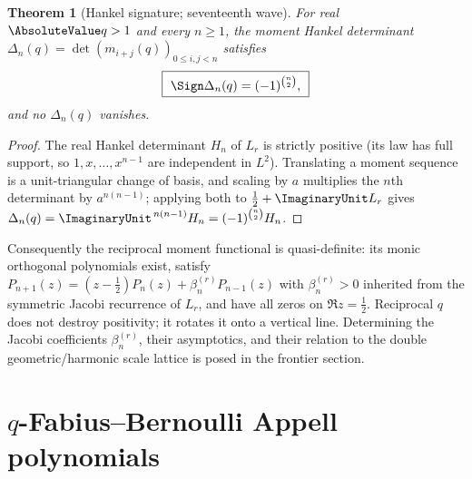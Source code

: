 \documentclass[11pt,oneside]{article}
\numberwithin{equation}{section}
\newtheorem{theorem}{Theorem}[section]
\theoremstyle{definition}
\theoremstyle{remark}
\begin{document}
\begin{theorem}[Hankel signature; seventeenth wave]
\label{p7:thm:hankel}
For real $\AbsoluteValue q>1$ and every $n\ge1$, the moment Hankel determinant
$\Delta_n(q)=\det(m_{i+j}(q))_{0\le i,j<n}$ satisfies
\begin{equation}\label{p7:eq:hankel-signature}
 \boxed{\ \Sign\Delta_n(q)=(-1)^{\binom n2},\ }
\end{equation}
and no $\Delta_n(q)$ vanishes.
\end{theorem}

\begin{proof}
The real Hankel determinant $H_n$ of $L_r$ is strictly positive (its law has
full support, so $1,x,\ldots,x^{n-1}$ are independent in $L^2$).  Translating
a moment sequence is a unit-triangular change of basis, and scaling by $a$
multiplies the $n$th determinant by $a^{n(n-1)}$; applying both to
$\tfrac12+\ImaginaryUnit L_r$ gives $\Delta_n(q)=\ImaginaryUnit^{\,n(n-1)}H_n=(-1)^{\binom n2}H_n$.
\end{proof}

Consequently the reciprocal moment functional is quasi-definite: its monic
orthogonal polynomials exist, satisfy
$P_{n+1}(z)=(z-\tfrac12)P_n(z)+\beta_n^{(r)}P_{n-1}(z)$ with
$\beta_n^{(r)}>0$ inherited from the symmetric Jacobi recurrence of $L_r$, and
have all zeros on $\Re z=\tfrac12$.  Reciprocal $q$ does not destroy
positivity; it rotates it onto a vertical line.  Determining the Jacobi
coefficients $\beta_n^{(r)}$, their asymptotics, and their relation to the
double geometric/harmonic scale lattice is posed in the frontier section.

\section{\texorpdfstring{$q$}{q}-Fabius--Bernoulli Appell polynomials}
\label{p7:sec:appell}
\end{document}
